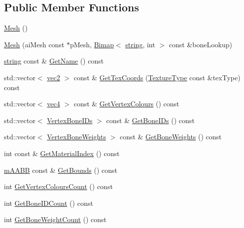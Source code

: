 \subsection*{Public Member Functions}
\begin{DoxyCompactItemize}
\item 
\hyperlink{class_mesh_a2af137f1571af89172b9c102302c416b}{Mesh} ()
\item 
\hyperlink{class_mesh_a83ab059ab28be894b1f6789d2cd2a284}{Mesh} (ai\+Mesh const $\ast$p\+Mesh, \hyperlink{class_bimap}{Bimap}$<$ \hyperlink{_types_8h_ad453f9f71ce1f9153fb748d6bb25e454}{string}, int $>$ const \&bone\+Lookup)
\item 
\hyperlink{_types_8h_ad453f9f71ce1f9153fb748d6bb25e454}{string} const \& \hyperlink{class_mesh_a89d04f09ef72d80428a8ccf785bd140f}{Get\+Name} () const 
\item 
std\+::vector$<$ \hyperlink{_types_8h_a43182e59794291f6ab00e51b160706c2}{vec2} $>$ const \& \hyperlink{class_mesh_a439e94789ab0ea3ed621571d51e3a8b5}{Get\+Tex\+Coords} (\hyperlink{_material_8h_a65468556d79304b3a4bfc464cc12e549}{Texture\+Type} const \&tex\+Type) const 
\item 
std\+::vector$<$ \hyperlink{_types_8h_ac54e849f8b2339f592307eaf6cdbba77}{vec4} $>$ const \& \hyperlink{class_mesh_a34a5a4c2176fb4b6d28376dda371f2ee}{Get\+Vertex\+Colours} () const 
\item 
std\+::vector$<$ \hyperlink{struct_vertex_bone_i_ds}{Vertex\+Bone\+I\+Ds} $>$ const \& \hyperlink{class_mesh_ac0e35c1a8db55cd42eecec5c1f4759ce}{Get\+Bone\+I\+Ds} () const 
\item 
std\+::vector$<$ \hyperlink{struct_vertex_bone_weights}{Vertex\+Bone\+Weights} $>$ const \& \hyperlink{class_mesh_a62cb72d0b97f28cb095e1e9425217c83}{Get\+Bone\+Weights} () const 
\item 
int const \& \hyperlink{class_mesh_a528b9b1fb56388d211bee9af735bb71b}{Get\+Material\+Index} () const 
\item 
\hyperlink{structm_a_a_b_b}{m\+A\+A\+BB} const \& \hyperlink{class_mesh_a0275b89f6b0269d04480a278987dbdbb}{Get\+Bounds} () const 
\item 
int \hyperlink{class_mesh_aa3b41b04e44787d2d4ec7b437b1c5bb5}{Get\+Vertex\+Colours\+Count} () const 
\item 
int \hyperlink{class_mesh_adb0883f54b390a9184c26642d46c051d}{Get\+Bone\+I\+D\+Count} () const 
\item 
int \hyperlink{class_mesh_a6a413d592fb461115d21a775a94bac7c}{Get\+Bone\+Weight\+Count} () const 
\item 

\end{DoxyCompactItemize}

